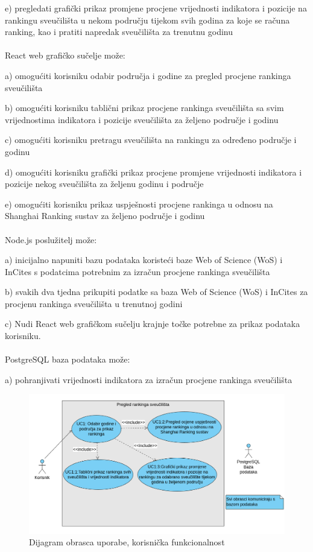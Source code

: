\documentclass[times, utf8, zavrsni]{fer}
\begin{document}
e) pregledati grafički prikaz promjene procjene vrijednosti indikatora i pozicije na rankingu sveučilišta u nekom području tijekom svih godina 
za koje se računa ranking, kao i pratiti napredak sveučilišta za trenutnu godinu
\\
\\React web grafičko sučelje može:

a) omogućiti korisniku odabir područja i godine za pregled procjene rankinga sveučilišta

b) omogućiti korisniku tablični prikaz procjene rankinga sveučilišta sa svim vrijednostima indikatora i pozicije sveučilišta za željeno područje i godinu

c) omogućiti korisniku pretragu sveučilišta na rankingu za određeno područje i godinu

d) omogućiti korisniku grafički prikaz procjene promjene vrijednosti indikatora i pozicije nekog sveučilišta za željenu godinu i područje

e) omogućiti korisniku prikaz uspješnosti procjene rankinga u odnosu na Shanghai Ranking sustav za željeno područje i godinu
\\
\\Node.js poslužitelj može:

a) inicijalno napuniti bazu podataka koristeći baze Web of Science (WoS) i InCites s podatcima potrebnim za izračun procjene rankinga sveučilišta

b) svakih dva tjedna prikupiti podatke sa baza Web of Science (WoS) i InCites za procjenu rankinga sveučilišta u trenutnoj godini

c) Nudi React web grafičkom sučelju krajnje točke potrebne za prikaz podataka korisniku.
\\
\\PostgreSQL baza podataka može:

a) pohranjivati vrijednosti indikatora za izračun procjene rankinga sveučilišta
\\
\begin{figure}[htb]
    
    \includegraphics[scale=0.4]{slika1.png}
    \caption{Dijagram obrasca uporabe, korisnička funkcionalnost}
    \label{fig:korisnik}
    \end{figure}
\newpage
\end{document}
